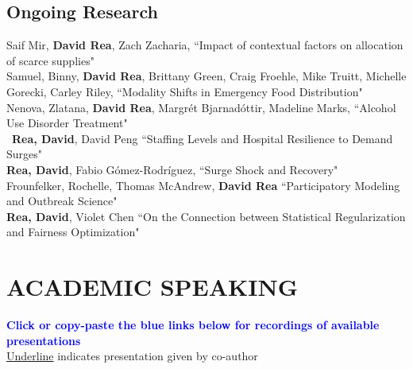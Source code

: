 \documentclass[12pt, letter]{moderncv}
\begin{document}
\subsection{Ongoing Research}
\medskip 
Saif Mir, \textbf{David Rea}, Zach Zacharia, ``Impact of contextual factors on allocation of scarce supplies" \smallskip
\medskip\\
Samuel, Binny, \textbf{David Rea}, Brittany Green, Craig Froehle, Mike Truitt, Michelle Gorecki, Carley Riley, ``Modality Shifts in Emergency Food Distribution"
\medskip\\
Nenova, Zlatana, \textbf{David Rea}, Margr\'et Bjarnad\'ottir, Madeline Marks, ``Alcohol Use Disorder Treatment"
\medskip\\\
\textbf{Rea, David}, David Peng ``Staffing Levels and Hospital Resilience to Demand Surges"
\medskip\\
\textbf{Rea, David}, Fabio Gómez-Rodríguez, ``Surge Shock and Recovery"
\medskip\\
Frounfelker, Rochelle, Thomas McAndrew, \textbf{David Rea} ``Participatory Modeling and Outbreak Science"
\medskip\\
\textbf{Rea, David}, Violet Chen  ``On the Connection between Statistical Regularization and Fairness Optimization"
\section{ACADEMIC SPEAKING}
\textbf{\textcolor{blue}{Click or copy-paste the blue links below for recordings of available presentations}}\\
\underline{Underline} indicates presentation given by co-author
\smallskip
\end{document}
